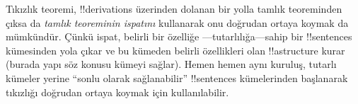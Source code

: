 \documentclass[../../../include/open-logic-section]{subfiles}
\begin{document}
Tıkızlık teoremi, !!{derivation}s üzerinden dolanan bir yolla tamlık
teoreminden çıksa da \emph{tamlık teoreminin ispatını} kullanarak onu
doğrudan ortaya koymak da mümkündür. Çünkü ispat, belirli bir özelliğe
---tutarlılığa---sahip bir !!{sentence}s kümesinden yola çıkar ve bu
kümeden belirli özellikleri olan !!a{structure} kurar (burada yapı söz
konusu kümeyi sağlar). Hemen hemen aynı kuruluş, tutarlı kümeler yerine
``sonlu olarak sağlanabilir'' !!{sentence}s kümelerinden başlanarak
tıkızlığı doğrudan ortaya koymak için kullanılabilir.
\end{document}
